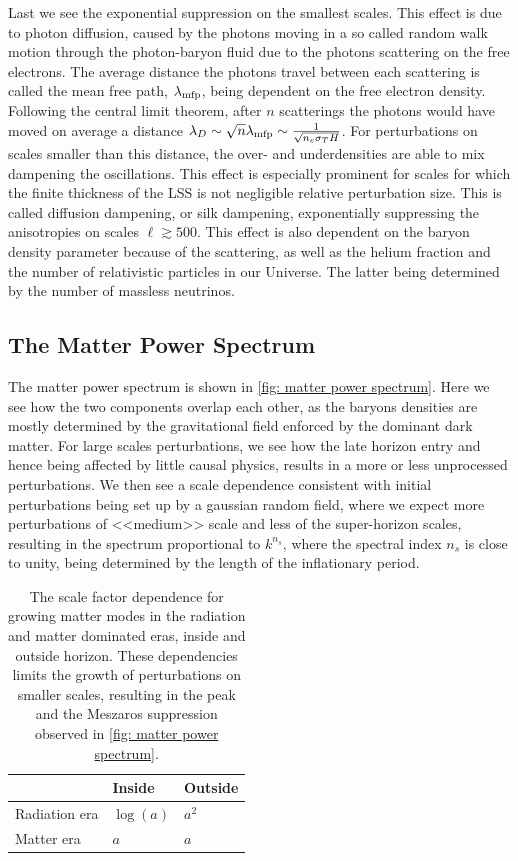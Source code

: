 \documentclass[10pt,a4paper]{article}
\begin{document}
Last we see the exponential suppression on the smallest scales. This effect is due to photon diffusion, caused by the photons moving in a so called random walk motion through the photon-baryon fluid due to the photons scattering on the free electrons. The average distance the photons travel between each scattering is called the mean free path, $\lambda_{\rm{mfp}}$, being dependent on the free electron density. Following the central limit theorem, after $n$ scatterings the photons would have moved on average a distance $\lambda_D \sim \sqrt{n}\lambda_{\rm{mfp}} \sim \frac{1}{\sqrt{n_e\sigma_T H}}$. For perturbations on scales smaller than this distance, the over- and underdensities are able to mix dampening the oscillations. This effect is especially prominent for scales for which the finite thickness of the LSS is not negligible relative perturbation size. This is called diffusion dampening, or silk dampening, exponentially suppressing the anisotropies on scales $\ell\gtrsim 500$. This effect is also dependent on the baryon density parameter because of the scattering, as well as the helium fraction and the number of relativistic particles in our Universe. The latter being determined by the number of massless neutrinos.

\subsection{The Matter Power Spectrum}
\label{subsec:Results/Matter power spectrum}
The matter power spectrum is shown in \cref{fig: matter power spectrum}. Here we see how the two components overlap each other, as the baryons densities are mostly determined by the gravitational field enforced by the dominant dark matter. For large scales perturbations, we see how the late horizon entry and hence being affected by little causal physics, results in a more or less unprocessed perturbations. We then see a scale dependence consistent with initial perturbations being set up by a gaussian random field, where we expect more perturbations of <<medium>> scale and less of the super-horizon scales, resulting in the spectrum proportional to $k^{n_s}$, where the spectral index $n_s$ is close to unity, being determined by the length of the inflationary period. 

\begin{table}[ht!]
  \centering
  \begin{tabular}{l|l|l}
                & Inside    & Outside \\ \hline
  Radiation era & $\log(a)$ & $a^2$   \\ \hline
  Matter era    & $a$       & $a$    
  \end{tabular}
  \caption{The scale factor dependence for growing matter modes in the radiation and matter dominated eras, inside and outside horizon. These dependencies limits the growth of perturbations on smaller scales, resulting in the peak and the Meszaros suppression observed in \cref{fig: matter power spectrum}.}
  \label{tab: growing modes}
\end{table}
\end{document}
